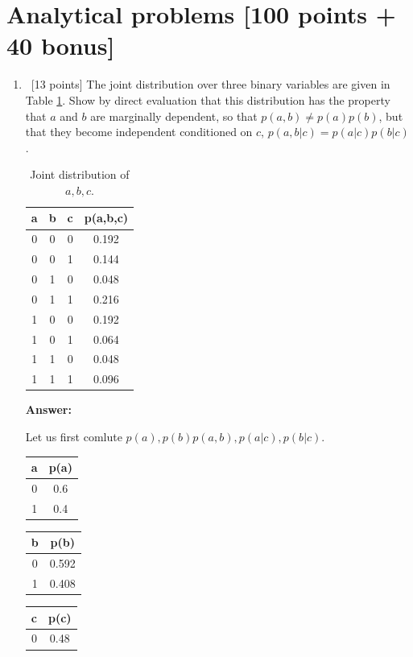 \documentclass[12pt, fullpage,letterpaper]{article}
\def\red{\color{black!30!red}}
\def\blackblue{\color{black!40!blue}}
\begin{document}
\section*{Analytical problems [100 points + 40 bonus]}	
\label{sec:q1}
\begin{enumerate}
\item~[13 points] The joint distribution over three binary variables are given in Table \ref{tb:abc}. Show by direct evaluation that this distribution has the property that $a$ and $b$ are marginally dependent, so that $p(a, b) \neq p(a)p(b)$, but that they become independent conditioned on $c$, \ie  $p(a,b|c) = p(a|c)p(b|c)$. 
\begin{table}
	\centering
	\begin{tabular}{c|c|c|c}
		\hline
		a & b & c  & p(a,b,c)\\
		\hline
		0 & 0 & 0 & 0.192\\
		0 & 0 & 1 & 0.144\\
		0 & 1 & 0 & 0.048\\
		0 & 1 & 1 & 0.216\\
	    1 & 0 & 0 & 0.192\\
	    1 & 0 & 1  & 0.064\\
	    1 & 1 & 0 & 0.048\\
	    1 & 1 & 1 & 0.096\\
	    \hline
	\end{tabular}
\caption{Joint distribution of $a,b,c$.} \label{tb:abc}
\end{table}
{\bf \red Answer:}{\blackblue 
Let us first comlute $p(a),p(b) p(a,b), p(a|c), p(b|c)$.
\begin{table}
	\centering
	\begin{tabular}{||c|c||}
		\hline
		a & p(a)\\
		\hline
		0 & 0.6\\
		1 & 0.4\\
	    \hline
	\end{tabular}
	\quad\quad  
	\begin{tabular}{||c|c||}
		\hline
		b & p(b)\\
		\hline
		0 & 0.592\\
		1 & 0.408\\
	    \hline
	\end{tabular}
	\quad\quad  
	\begin{tabular}{||c|c||}
		\hline
		c & p(c)\\
		\hline
		0 & 0.48\\

\end{tabular}
\end{table}}
\end{enumerate}
\end{document}
